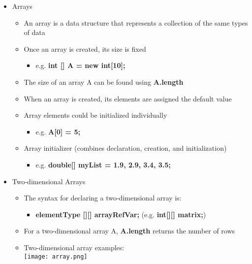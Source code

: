 \begin{itemize}
	\item Arrays
	\begin{itemize}
		\item An array is a data structure that represents a collection of the same types of data
		\item Once an array is created, its size is fixed
		\begin{itemize}
			\item e.g. \textbf{int [] A = new int[10];}
		\end{itemize}
		\item The size of an array A can be found using \textbf{A.length}
		\item When an array is created, its elements are assigned the default value
		\item Array elements could be initialized individually
		\begin{itemize}
			\item e.g. \textbf{A[0] = 5;}
		\end{itemize}
		\item Array initializer (combines declaration, creation, and initialization)
		\begin{itemize}
			\item e.g. \textbf{double[] myList = {1.9, 2.9, 3.4, 3.5};}
		\end{itemize}
	\end{itemize}

	\item Two-dimensional Arrays
	\begin{itemize}
		\item The syntax for declaring a two-dimensional array is:
		\begin{itemize}
			\item \textbf{elementType [][] arrayRefVar;} (e.g. \textbf{int[][] matrix;})
		\end{itemize}
		\item For a two-dimensional array A, \textbf{A.length} returns the number of rows
		\item Two-dimensional array examples:\\
		\texttt{[image: array.png]}
	\end{itemize}
\end{itemize}
